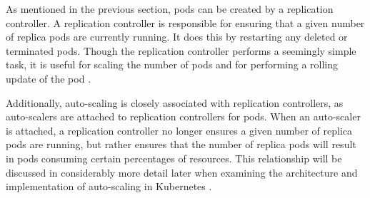 As mentioned in the previous section, pods can be created by a replication
controller. A replication controller is responsible for ensuring that a given
number of replica pods are currently running. It does this by restarting any
deleted or terminated pods. Though the replication controller performs a
seemingly simple task, it is useful for scaling the number of pods and for
performing a rolling update of the pod \cite{k8s-replication-controllers}.

Additionally, auto-scaling is closely associated with replication controllers, as
auto-scalers are attached to replication controllers for pods. When an
auto-scaler is attached, a replication controller no longer ensures a given
number of replica pods are running, but rather ensures that the number of
replica pods will result in pods consuming certain percentages of resources.
This relationship will be discussed in considerably more detail later when
examining the architecture and implementation of auto-scaling in Kubernetes
\cite{k8s-horizontal-pod-autoscaler-proposal}.
